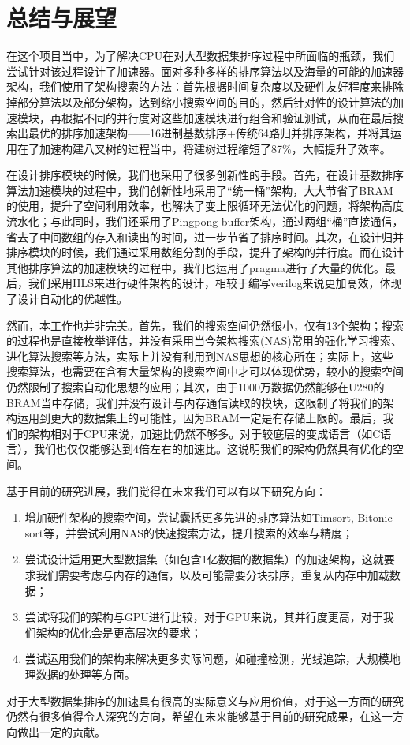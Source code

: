 
\chapter{总结与展望}


在这个项目当中，为了解决CPU在对大型数据集排序过程中所面临的瓶颈，我们尝试针对该过程设计了加速器。面对多种多样的排序算法以及海量的可能的加速器架构，我们使用了架构搜索的方法：首先根据时间复杂度以及硬件友好程度来排除掉部分算法以及部分架构，达到缩小搜索空间的目的，然后针对性的设计算法的加速模块，再根据不同的并行度对这些加速模块进行组合和验证测试，从而在最后搜索出最优的排序加速架构——16进制基数排序+传统64路归并排序架构，并将其运用在了加速构建八叉树的过程当中，将建树过程缩短了87\%，大幅提升了效率。

在设计排序模块的时候，我们也采用了很多创新性的手段。首先，在设计基数排序算法加速模块的过程中，我们创新性地采用了“统一桶”架构，大大节省了BRAM的使用，提升了空间利用效率，也解决了变上限循环无法优化的问题，将架构高度流水化；与此同时，我们还采用了Pingpong-buffer架构，通过两组“桶”直接通信，省去了中间数组的存入和读出的时间，进一步节省了排序时间。其次，在设计归并排序模块的时候，我们通过采用数组分割的手段，提升了架构的并行度。而在设计其他排序算法的加速模块的过程中，我们也运用了pragma进行了大量的优化。最后，我们采用HLS来进行硬件架构的设计，相较于编写verilog来说更加高效，体现了设计自动化的优越性。

然而，本工作也并非完美。首先，我们的搜索空间仍然很小，仅有13个架构；搜索的过程也是直接枚举评估，并没有采用当今架构搜索(NAS)常用的强化学习搜索、进化算法搜索等方法，实际上并没有利用到NAS思想的核心所在；实际上，这些搜索算法，也需要在含有大量架构的搜索空间中才可以体现优势，较小的搜索空间仍然限制了搜索自动化思想的应用；其次，由于1000万数据仍然能够在U280的BRAM当中存储，我们并没有设计与内存通信读取的模块，这限制了将我们的架构运用到更大的数据集上的可能性，因为BRAM一定是有存储上限的。最后，我们的架构相对于CPU来说，加速比仍然不够多。对于较底层的变成语言（如C语言），我们也仅仅能够达到4倍左右的加速比。这说明我们的架构仍然具有优化的空间。

基于目前的研究进展，我们觉得在未来我们可以有以下研究方向：
\begin{enumerate}
    \item 增加硬件架构的搜索空间，尝试囊括更多先进的排序算法如Timsort, Bitonic sort等，并尝试利用NAS的快速搜索方法，提升搜索的效率与精度；
    \item 尝试设计适用更大型数据集（如包含1亿数据的数据集）的加速架构，这就要求我们需要考虑与内存的通信，以及可能需要分块排序，重复从内存中加载数据；
    \item 尝试将我们的架构与GPU进行比较，对于GPU来说，其并行度更高，对于我们架构的优化会是更高层次的要求；
    \item 尝试运用我们的架构来解决更多实际问题，如碰撞检测，光线追踪，大规模地理数据的处理等方面。
\end{enumerate}

对于大型数据集排序的加速具有很高的实际意义与应用价值，对于这一方面的研究仍然有很多值得令人深究的方向，希望在未来能够基于目前的研究成果，在这一方向做出一定的贡献。